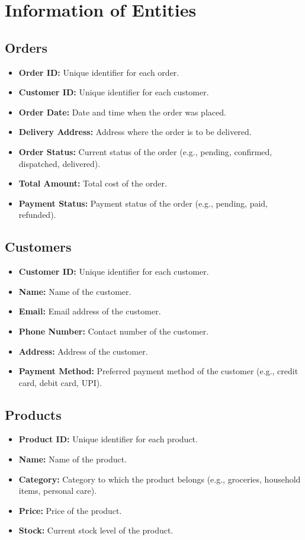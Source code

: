 \section{Information of Entities}
\subsection{Orders}
\begin{itemize}
    \item \textbf{Order ID:} Unique identifier for each order.
    \item \textbf{Customer ID:} Unique identifier for each customer.
    \item \textbf{Order Date:} Date and time when the order was placed.
    \item \textbf{Delivery Address:} Address where the order is to be delivered.
    \item \textbf{Order Status:} Current status of the order (e.g., pending, confirmed, dispatched, delivered).
    \item \textbf{Total Amount:} Total cost of the order.
    \item \textbf{Payment Status:} Payment status of the order (e.g., pending, paid, refunded).
\end{itemize}

\subsection{Customers}
\begin{itemize}
    \item \textbf{Customer ID:} Unique identifier for each customer.
    \item \textbf{Name:} Name of the customer.
    \item \textbf{Email:} Email address of the customer.
    \item \textbf{Phone Number:} Contact number of the customer.
    \item \textbf{Address:} Address of the customer.
    \item \textbf{Payment Method:} Preferred payment method of the customer (e.g., credit card, debit card, UPI).
\end{itemize}

\subsection{Products}
\begin{itemize}
    \item \textbf{Product ID:} Unique identifier for each product.
    \item \textbf{Name:} Name of the product.
    \item \textbf{Category:} Category to which the product belongs (e.g., groceries, household items, personal care).
    \item \textbf{Price:} Price of the product.
    \item \textbf{Stock:} Current stock level of the product.
\end{itemize}

